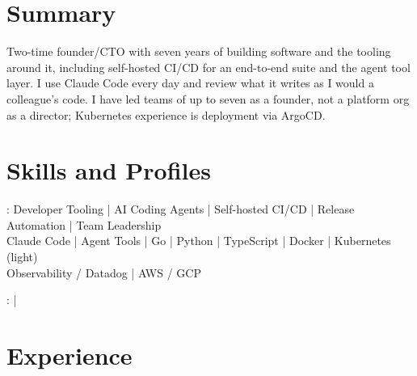 \documentclass[print]{jack-resume}
\begin{document}
\pagecolor{darkmodeBackground}


\begin{minipage}[t][1cm][t]{.03\textwidth}
    \hfill
\end{minipage}

\section{Summary}
Two-time founder/CTO with seven years of building software and the tooling around it, including self-hosted CI/CD for an end-to-end suite and the agent tool layer. I use Claude Code every day and review what it writes as I would a colleague's code. I have led teams of up to seven as a founder, not a platform org as a director; Kubernetes experience is deployment via ArgoCD.
\sectionsep

\section{Skills and Profiles}
:
Developer Tooling \hfill | \hfill
AI Coding Agents \hfill | \hfill
Self-hosted CI/CD \hfill | \hfill
Release Automation \hfill | \hfill
Team Leadership \\
\hspace{1.0cm} Claude Code \hfill | \hfill
Agent Tools \hfill | \hfill
Go \hfill | \hfill
Python \hfill | \hfill
TypeScript \hfill | \hfill
Docker \hfill | \hfill
Kubernetes (light) \\
\hspace{1.0cm} Observability / Datadog \hfill | \hfill
AWS / GCP \\

\raggedright{
    :
      \href{https://www.linkedin.com/in/jack-sturtevant/}{ \ExternalLink} |
     \href{https://github.com/jacksturt}{ \ExternalLink}}

\section{Experience}
\end{document}

